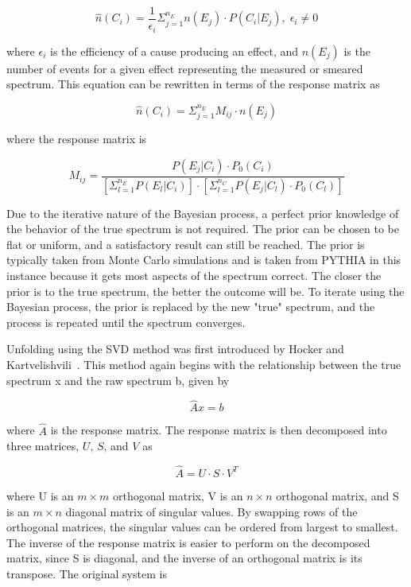 \begin{equation}
    \hat{n}(C_i) = \frac{1}{\epsilon_i}\Sigma_{j=1}^{n_E}n(E_j)\cdot P(C_i|E_j), \; \epsilon_i \neq 0
\end{equation}

\noindent
where $\epsilon_i$ is the efficiency of a cause producing an effect, and $n(E_j)$ is the number of events for a given effect representing the measured or smeared spectrum. This equation can be rewritten in terms of the response matrix as

\begin{equation}
    \hat{n}(C_i) = \Sigma_{j=1}^{n_E}M_{ij}\cdot n(E_j)
\end{equation}

\noindent
where the response matrix is

\begin{equation}
    M_{ij} = \frac{P(E_j|C_i)\cdot P_0(C_i)}{[\Sigma_{l=1}^{n_E}P(E_l|C_i)] \cdot [\Sigma_{l=1}^{n_C}P(E_j|C_l)\cdot P_0(C_l)]}
\end{equation}

\noindent
Due to the iterative nature of the Bayesian process, a perfect prior knowledge of the behavior of the true spectrum is not required. The prior can be chosen to be flat or uniform, and a satisfactory result can still be reached. The prior is typically taken from Monte Carlo simulations and is taken from PYTHIA in this instance because it gets most aspects of the spectrum correct. The closer the prior is to the true spectrum, the better the outcome will be. To iterate using the Bayesian process, the prior is replaced by the new "true" spectrum, and the process is repeated until the spectrum converges. 

Unfolding using the SVD method was first introduced by Hocker and Kartvelishvili~\cite{Hocker:1995kb}. This method again begins with the relationship between the true spectrum x and the raw spectrum b, given by

\begin{equation}
    \hat{A}x = b
\end{equation}

\noindent
where $\hat{A}$ is the response matrix. The response matrix is then decomposed into three matrices, $U$, $S$, and $V$ as 

\begin{equation}
    \hat{A} = U \cdot S \cdot V^T
\end{equation}

\noindent 
where U is an $m \times m$ orthogonal matrix, V is an $n \times n$ orthogonal matrix, and S is an $m \times n$ diagonal matrix of singular values. By swapping rows of the orthogonal matrices, the singular values can be ordered from largest to smallest. The inverse of the response matrix is easier to perform on the decomposed matrix, since S is diagonal, and the inverse of an orthogonal matrix is its transpose. The original system is 

